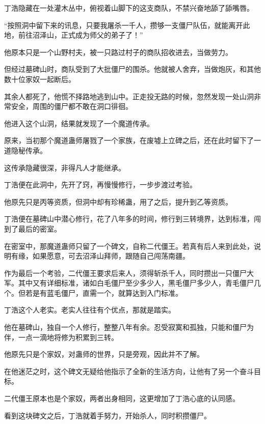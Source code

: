 
\begin{this_body}



丁浩隐藏在一处灌木丛中，俯视着山脚下的这支商队，不禁兴奋地舔了舔嘴唇。

“按照洞中留下来的讯息，只要我屠杀一千人，攒够一支僵尸队伍，就能离开此地，前往沼泽山，正式成为师父的弟子了！”

他原本只是一个山野村夫，被一只路过村子的商队招收进去，当做劳力。

但经过墓碑山时，商队受到了大批僵尸的围杀。他就被人舍弃，当做炮灰，和其他数十位家奴一起断后。

其余人都死了，他慌不择路地逃到山中。正走投无路的时候，忽然发现一处山洞非常安全，周围的僵尸都不敢在洞口徘徊。

他进入这个山洞，结果就发现了一个魔道传承。

原来，当初那个魔道蛊师屠戮了一个家族，在废墟上立碑之后，还在此时留下了一道隐秘传承。

这传承隐藏很深，非得凡人才能继承。

丁浩便在此洞中，先开了窍，再慢慢修行，一步步渡过考验。

他原先只是丙等资质，但洞中却有珍稀蛊，用了之后，提升到乙等资质。

丁浩便在墓碑山中潜心修行，花了八年多的时间，修行到三转境界，达到标准，闯到了最后的密室。

在密室中，那魔道蛊师只留了一个碑文，自称二代僵王。若真有后人来到此处，说明有缘，如果愿意，可去沼泽山拜师，跟随自己闯荡南疆。

作为最后一个考验，二代僵王要求后来人，须得斩杀千人，同时攒出一只僵尸大军。其中又有详细标准，诸如白毛僵尸至少多少人，黑毛僵尸多少人，青毛僵尸几个。但若是有蓝毛僵尸，直需一个，就算达到入门标准。

丁浩这个人老实。老实人往往有个优点，那就是踏实。

他在墓碑山，独自一个人修行，整整八年有余。忍受寂寞和孤独，只能和僵尸为伴，一点一滴地将修为积累到三转。

他原先只是个家奴，对蛊师的世界，只是旁观，因此并不了解。

在他迷茫之时，这个碑文无疑给他指示了全新的生活方向，让他有了另一个奋斗目标。

二代僵王原本也是个家奴，两者出身相同，这更增加了丁浩心底的认同感。

看到这块碑文之后，丁浩就着手努力，开始杀人，同时积攒僵尸。


\end{this_body}
